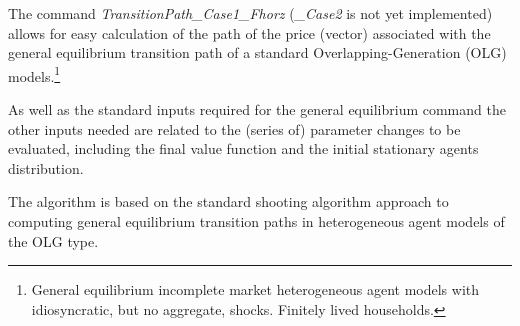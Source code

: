 The command \textit{TransitionPath\_{}Case1\_{}Fhorz} (\textit{\_{}Case2} is not yet implemented) allows for easy calculation of the path of the price (vector) associated with the general equilibrium transition path of
a standard Overlapping-Generation (OLG) models.\footnote{General equilibrium incomplete market heterogeneous agent models with idiosyncratic, but no aggregate, shocks. Finitely lived households.}

As well as the standard inputs required for the general equilibrium command the other inputs needed are related to the (series of)
parameter changes to be evaluated, including the final value function and the initial stationary agents distribution.

The algorithm is based on the standard shooting algorithm approach to computing general equilibrium transition paths in heterogeneous
agent models of the OLG type.

%

